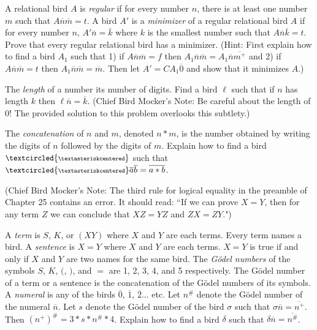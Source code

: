 \documentclass[12pt, letterpaper]{article}
\begin{document}
\begin{prob}{24.10}
A relational bird $A$ is \emph{regular} if for every number $n$, there is at least one number $m$ such that $A\overline{n}\overline{m} = t$. A bird $A'$ is a \emph{minimizer} of a regular relational bird $A$ if for every number $n$, $A'\overline{n} = \overline{k}$ where $k$ is the smallest number such that $A\overline{n}\overline{k} = t$. Prove that every regular relational bird has a minimizer. (Hint: First explain how to find a bird $A_1$ such that 1) if $A\overline{n}\overline{m} = f$ then $A_1\overline{n}\overline{m} = A_1\overline{n}\overline{m^+}$ and 2) if $A\overline{n}\overline{m} = t$ then $A_1\overline{n}\overline{m} = \overline{m}$. Then let $A' = CA_1\overline{0}$ and show that it minimizes $A$.)
\end{prob}

\begin{prob}{24.11}
The \emph{length} of a number its number of digits. Find a bird $\ell$ such that if $n$ has length $k$ then $\ell\overline{n} = \overline{k}$. (Chief Bird Mocker's Note: Be careful about the length of 0! The provided solution to this problem overlooks this subtlety.)
\end{prob}

\begin{prob}{24.12}
The \emph{concatenation} of $n$ and $m$, denoted $n \ast m$, is the number obtained by writing the digits of $n$ followed by the digits of $m$. Explain how to find a bird $\small \textcircled{\scriptsize \textasteriskcentered}$ such that $\small \textcircled{\scriptsize \textasteriskcentered}\overline{a}\overline{b} = \overline{a \ast b}$.
\end{prob}

\noindent(Chief Bird Mocker's Note: The third rule for logical equality in the preamble of Chapter 25 contains an error. It should read: ``If we can prove $X = Y$, then for any term $Z$ we can conclude that $XZ = YZ$ and $ZX = ZY$.")

\begin{prob}{25.1}
A \emph{term} is $S$, $K$, or $(XY)$ where $X$ and $Y$ are each terms. Every term names a bird. A \emph{sentence} is $X = Y$ where $X$ and $Y$ are each terms. $X = Y$ is true if and only if $X$ and $Y$ are two names for the same bird. The \emph{G\"{o}del numbers} of the symbols $S$, $K$, $($, $)$, and $=$ are 1, 2, 3, 4, and 5 respectively. The G\"{o}del number of a term or a sentence is the concatenation of the G\"{o}del numbers of its symbols. A \emph{numeral} is any of the birds $\overline{0}$, $\overline{1}$, $\overline{2}$... etc. Let $n^\#$ denote the G\"{o}del number of the numeral $\overline{n}$. Let $s$ denote the G\"{o}del number of the bird $\sigma$ such that $\sigma \overline{n} = \overline{n^+}$. Then $(n^+)^\# = 3 \ast s \ast n^\# \ast 4$. Explain how to find a bird $\delta$ such that $\delta \overline{n} = \overline{n^\#}$.
\end{prob}
\end{document}
